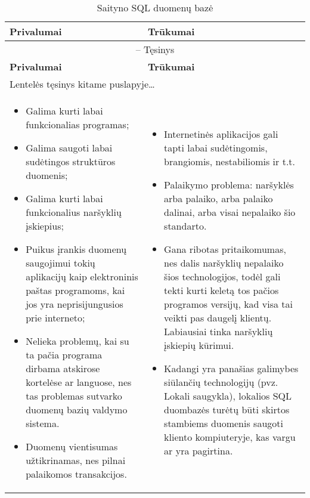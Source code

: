 \documentclass[12pt,a4paper,titlepage]{article}
\begin{document}
\begin{longtable}{|p{6.4cm}|p{6.4cm}|}
\caption{Saityno SQL duomenų bazė \label{table:web_sql_db}}\\

\hline \hline
{\textbf{Privalumai}} &
{\textbf{Trūkumai}}\\
\hline
\endfirsthead


\multicolumn{2}{c}{{\tablename} \thetable{} -- Tęsinys} \\[0.5ex]
\hline \hline
{\textbf{Privalumai}} &
{\textbf{Trūkumai}}\\
\hline
\endhead


\multicolumn{2}{l}{{Lentelės tęsinys kitame puslapyje\ldots}} \\
\endfoot


\hline \hline
\endlastfoot
\hline 
\begin{itemize}
  \item Galima kurti labai funkcionalias programas;
  \item Galima saugoti labai sudėtingos struktūros duomenis;
  \item Galima kurti labai funkcionalius naršyklių įskiepius;
  \item Puikus įrankis duomenų saugojimui tokių aplikacijų kaip elektroninis paštas programoms, kai jos yra neprisijungusios prie interneto;
  \item Nelieka problemų, kai su ta pačia programa dirbama atskirose kortelėse ar languose, nes tas problemas sutvarko duomenų bazių valdymo sistema.
  \item Duomenų vientisumas užtikrinamas, nes pilnai palaikomos transakcijos.
\end{itemize}
&
\begin{itemize}
  \item Internetinės aplikacijos gali tapti labai sudėtingomis, brangiomis, nestabiliomis ir t.t.
  \item Palaikymo problema: naršyklės arba palaiko, arba palaiko dalinai, arba visai nepalaiko šio standarto.
  \item Gana ribotas pritaikomumas, nes dalis naršyklių nepalaiko šios technologijos, todėl gali tekti kurti keletą tos pačios programos versijų, kad visa tai veikti pas daugelį klientų. Labiausiai tinka naršyklių įskiepių kūrimui.
  \item Kadangi yra panašias galimybes siūlančių technologijų (pvz. Lokali saugykla), lokalios SQL duombazės turėtų būti skirtos stambiems duomenis saugoti kliento kompiuteryje, kas vargu ar yra pagirtina.
\end{itemize}
\end{longtable}
\end{document}
